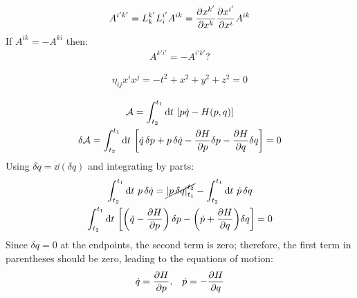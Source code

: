 \documentclass{report}
\theoremstyle{definition}
\begin{document}
\begin{chapter1}
	\begin{gather*}
		A^{i'k'} = L^{k'}_k L^{i'}_i A^{ik} = \pdv{x^{k'}}{x^k}\pdv{x^{i'}}{x^i}A^{ik}
	\end{gather*}
	If $A^{ik} = -A^{ki}$ then:
	\begin{gather*}
		A^{k'i'} = - A^{i'k'} ?
	\end{gather*}
\end{chapter1}

\begin{chapter1}

\end{chapter1}

\begin{chapter1}
	\begin{gather*}
		\eta_{ij}x^{i}x^{j} = -t^2 + x^2 + y^2 + z^2 = 0 
	\end{gather*}
\end{chapter1}

\begin{chapter1}
	
\end{chapter1}

\begin{chapter1}
	\begin{gather*}
		\mathcal A = \int_{t_2}^{t_1}\dd{t}\,\bqty{p\dot q - H(p,q)} \\
		\delta\mathcal A = \int_{t_2}^{t_1} \dd{t}\, \bqty{\dot q\,\delta p + p\,\delta\dot q  - \pdv{H}{p}\delta p - \pdv{H}{q}\delta q} = 0
	\end{gather*}
	Using $\delta\dot q = \dot\dd(\delta q)$ and integrating by parts:
	\begin{gather*}
		\int_{t_2}^{t_1} \dd{t}\, p\,\delta \dot q = \cancel{\left|p\,\delta q\right|_{t_1}^{t_2}} - \int_{t_2}^{t_1} \dd{t}\,\dot p\, \delta q  \\
		\int_{t_2}^{t_1} \dd{t}\, \bqty{\pqty{\dot q -\pdv{H}{p}}\,\delta p - \pqty{\dot p + \pdv{H}{q}}\delta q} = 0
	\end{gather*}
	Since $\delta q = 0 $ at the endpoints, the second term is zero; therefore, the first term in parentheses should be zero, leading to the equations of motion:
	\begin{gather*}
		\dot q = \pdv{H}{p},\;\;\;\dot p = -\pdv{H}{q} 	
	\end{gather*} 
\end{chapter1}
\end{document}
